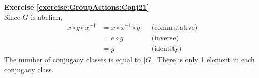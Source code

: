 \noindent\textbf{Exercise \ref{exercise:GroupActions:Conj21}}
\\
Since $G$ is abelian, 
\begin{align*}
x \circ g \circ x^{-1} &= x \circ x^{-1} \circ g &&\text{(commutative)}
\\
&= e \circ g &&\text{(inverse)}
\\
&= g &&\text{(identity)}
\end{align*}
The number of conjugacy classes is equal to $|G|$. There is only 1 element in each conjugacy class.
